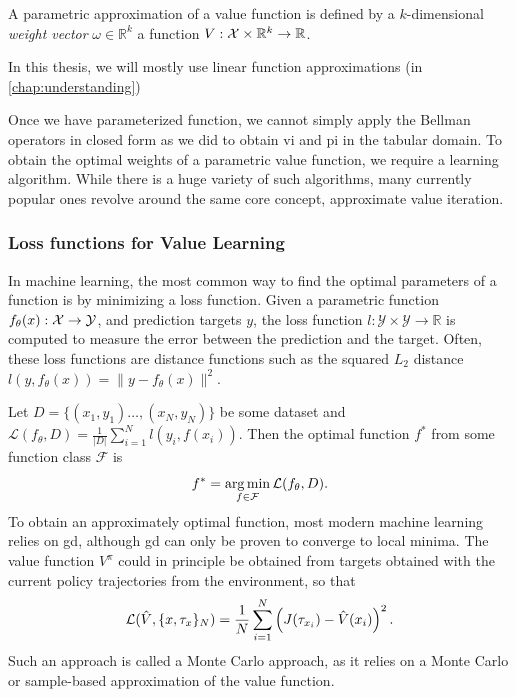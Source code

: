 \begin{definition}
    A parametric approximation of a value function is defined by a $k$-dimensional \emph{weight vector} $\omega \in \mathbb{R}^k$ a function $V: \mathcal{X} \times \mathbb{R}^k \rightarrow \mathbb{R}$.
\end{definition}

In this thesis, we will mostly use linear function approximations (in \autoref{chap:understanding})

Once we have parameterized function, we cannot simply apply the Bellman operators in closed form as we did to obtain \ac{vi} and \ac{pi} in the tabular domain.
To obtain the optimal weights of a parametric value function, we require a learning algorithm.
While there is a huge variety of such algorithms, many currently popular ones revolve around the same core concept, approximate value iteration.

\subsubsection{Loss functions for Value Learning}

In machine learning, the most common way to find the optimal parameters of a function is by minimizing a loss function.
Given a parametric function $f_\theta(x): \mathcal{X} \rightarrow \mathcal{Y}$, and prediction targets $y$, the loss function $l: \mathcal{Y} \times \mathcal{Y} \rightarrow \mathbb{R}$ is computed to measure the error between the prediction and the target.
Often, these loss functions are distance functions such as the squared $L_2$ distance $l(y, f_\theta(x)) = \|y - f_\theta(x)\|^2$.

Let $D = \{(x_1, y_1) \dots, (x_N, y_N)\}$ be some dataset and $\mathcal{L}(f_\theta,D) = \frac{1}{|D|} \sum_{i=1}^N l(y_i, f(x_i))$.
Then the optimal function $f^*$ from some function class $\mathcal{F}$ is $$f^* = \operatorname*{arg\,min}_{f \in \mathcal{F}} \mathcal{L}(f_\theta,D).$$
To obtain an approximately optimal function, most modern machine learning relies on \ac{gd}, although \ac{gd} can only be proven to converge to local minima.
The value function $V^\pi$ could in principle be obtained from targets obtained with the current policy trajectories from the environment, so that $$\mathcal{L}(\hat{V}, \{x, \tau_{x}\}_N) = \frac{1}{N} \sum_{i=1}^N \left(J(\tau_{x_i}) - \hat{V}(x_i)\right)^2.$$
Such an approach is called a Monte Carlo approach, as it relies on a Monte Carlo or sample-based approximation of the value function.

